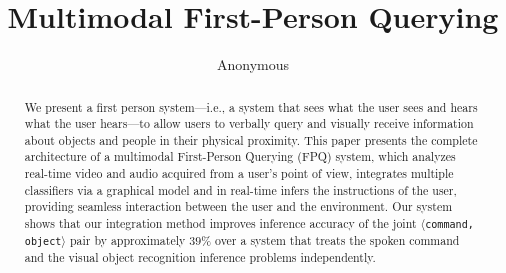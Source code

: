 \documentclass{llncs}
\begin{document}
%

\mainmatter              %
%





\title{Multimodal First-Person Querying}
%
%
\author{
Anonymous
%
%
%
}
\maketitle              %

\begin{abstract}
We present a first person system---i.e., a system that sees what the user sees and hears what the user hears---to allow users to verbally query and visually receive information about objects and people in their physical proximity. This paper presents the complete architecture of a multimodal First-Person Querying (FPQ) system, which analyzes real-time video and audio acquired from a user's point of view, integrates multiple classifiers via a graphical model and in real-time infers the instructions of the user, providing seamless interaction between the user and the environment. Our system shows that our integration method improves inference accuracy of the joint $\langle$\texttt{command, object}$\rangle$ pair by approximately $39\%$ over a system that treats the spoken command and the visual object recognition inference problems independently.
\end{abstract}
\end{document}
